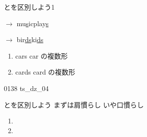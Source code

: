 \documentclass[aspectratio=169, xcolor={dvipsnames,table}]{beamer}
\begin{document}
\begin{frame}[plain]{とを区別しよう1}
  \Large

   $\rightarrow$ \hspace{95pt}\pause{}mu\underline{s}ic\hspace{10pt}play\underline{s}

  \pause

   $\rightarrow$ \hspace{80pt}\pause{}bir\underline{ds}\hspace{10pt}ki\underline{ds}

  \vfill

  \pause

  \begin{enumerate}
    \item cars \hfill{\scriptsize car の複数形}

    \item cards \hfill{\scriptsize card の複数形}
  \end{enumerate}

  \hfill{\tiny 0138}\,{\scriptsize {}}\,{\tiny ts\_dz\_04}
\end{frame}
\begin{frame}[plain]{とを区別しよう}
  まずは肩慣らし\pause{} いや口慣らし\pause

  \Large

  \begin{enumerate}
    \item {}\pause

    \item {}
  \end{enumerate}
\end{frame}
\end{document}
